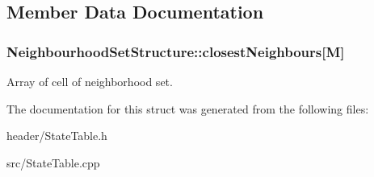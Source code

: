 \subsection{Member Data Documentation}
\hypertarget{structNeighbourhoodSetStructure_aa03783e6f5ef24889f05899ffb40e6ce}{
\subsubsection[{closest\-Neighbours}]{ Neighbourhood\-Set\-Structure\-::closest\-Neighbours\mbox{[}M\mbox{]}}}\label{structNeighbourhoodSetStructure_aa03783e6f5ef24889f05899ffb40e6ce}
Array of cell of neighborhood set. 

The documentation for this struct was generated from the following files\-:\begin{DoxyCompactItemize}
\item 
header/State\-Table.\-h\item 
src/State\-Table.\-cpp\end{DoxyCompactItemize}
